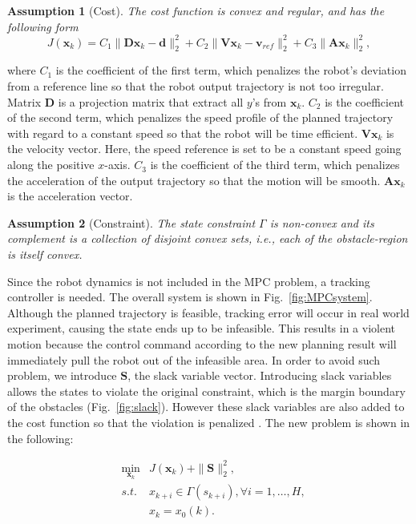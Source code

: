 \documentclass[letterpaper, 10 pt, conference]{ieeeconf}  %
\newtheorem{assumption}{Assumption}
\begin{document}
\begin{assumption}[Cost]
The cost function is convex and regular, and has the following form
\begin{equation}
J(\mathbf{x}_k) = C_1\|\mathbf{D}\mathbf{x}_k-\mathbf{d}\|_{2}^2 + C_2 \|\mathbf{V}\mathbf{x}_k-\mathbf{v}_{ref}\|_2^2 +C_3\|\mathbf{A}\mathbf{x}_{k}\|_2^2,  
\end{equation}
\end{assumption}
where $C_1$ is the coefficient of the first term, which penalizes the robot's deviation from a reference line so that the robot output trajectory is not too irregular. Matrix $\mathbf{D}$ is a projection matrix that extract all $y$'s from $\mathbf{x}_k$. $C_2$ is the coefficient of the second term, which penalizes the speed profile of the planned trajectory with regard to a constant speed so that the robot will be time efficient. $\mathbf{V}\mathbf{x}_k$ is the velocity vector. Here, the speed reference is set to be a constant speed going along the positive $x$-axis. $C_3$ is the coefficient of the third term, which penalizes the acceleration of the output trajectory so that the motion will be smooth. $\mathbf{A}\mathbf{x}_{k}$ is the acceleration vector.

\begin{assumption}[Constraint]
The state constraint $\Gamma$ is non-convex and its complement is a collection of disjoint convex sets, i.e., each of the obstacle-region is itself convex.
\end{assumption}

Since the robot dynamics is not included in the MPC problem, a tracking controller is needed. The overall system is shown in Fig.~\ref{fig:MPCsystem}. Although the planned trajectory  is feasible, tracking error will occur in real world experiment, causing the state ends up to be infeasible. This results in a violent motion because the control command according to the new planning result will immediately pull the robot out of the infeasible area. In order to avoid such problem, we introduce  $\mathbf{S}$, the slack variable vector. Introducing slack variables allows the states to violate the original constraint, which is the margin boundary of the obstacles (Fig.~\ref{fig:slack}). However these slack variables are also added to the cost function so that the violation is penalized \cite{chen2018foad}. The new problem is shown in the following:

\begin{eqnarray}
&\min_{\mathbf{x}_{k}} & J(\mathbf{x}_k) + \|\mathbf{S}\|_{2}^2 ,\\
&s.t.& x_{k+i} \in\Gamma(s_{k+i}),\forall i=1,\ldots,H,\\
&&         x_{k}=x_0(k).
\end{eqnarray} 
\end{document}

